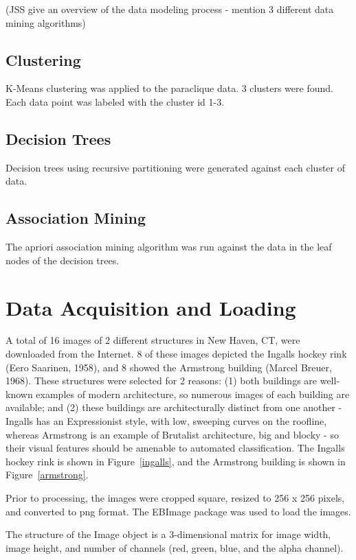 \documentclass[conference,compsoc]{IEEEtran}
\begin{document}
(JSS give an overview of the data modeling process - mention 3 different data mining algorithms)

\subsection{Clustering}

K-Means clustering was applied to the paraclique data.
3 clusters were found.
Each data point was labeled with the cluster id 1-3.

\subsection{Decision Trees}

Decision trees using recursive partitioning were generated against each cluster of data.

\subsection{Association Mining}

The apriori association mining algorithm was run against the data in the leaf nodes of the decision trees.

\section{Data Acquisition and Loading}

A total of 16 images of 2 different structures in New Haven, CT, were downloaded from the Internet.
8 of these images depicted the Ingalls hockey rink (Eero Saarinen, 1958), and 8 showed the Armstrong building (Marcel Breuer, 1968).
These structures were selected for 2 reasons: (1) both buildings are well-known examples of modern architecture, so numerous images of each
building are available; and (2) these buildings are architecturally distinct from one another - Ingalls has an Expressionist style, with low,
sweeping curves on the roofline, whereas Armstrong is an example of Brutalist architecture, big and blocky - so their visual features should
be amenable to automated classification. The Ingalls hockey rink is shown in Figure~\ref{ingalls}, and the Armstrong building is shown
in Figure~\ref{armstrong}.

Prior to processing, the images were cropped square, resized to 256 x 256 pixels, and converted to png format. The EBImage package was used to load the images.

The structure of the Image object is a 3-dimensional matrix 
for image width, image height, and number of channels (red, green, blue, and the alpha channel).
\end{document}
